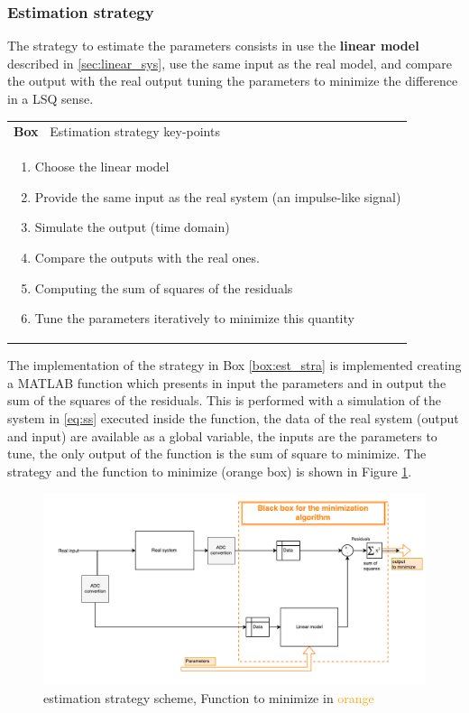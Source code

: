 \documentclass[twosided,a4paper]{article}           %
\newcounter{box}
\newenvironment{scatola}[1]
{\refstepcounter{box}
\begin{center}
		\begin{tabular}{|p{\linewidth}|}
			\hline \textbf{Box~\thebox} #1  \\
		}
		{ 
			 \\ \hline
		\end{tabular} 
	\end{center}
 }
\begin{document}
\subsubsection{Estimation strategy}
	\label{sec:est_strat}
 The strategy to estimate the parameters consists in use the \textbf{linear model} described in \ref{sec:linear_sys}, use the same input as the real model, and compare the output with the real output tuning the parameters to minimize the difference in a LSQ sense.
\begin{scatola}{Estimation strategy key-points}
	\label{box:est_stra}
 \begin{enumerate}
	 \item Choose the linear model
	 \item Provide the same input as the real system (an impulse-like signal)
	 \item Simulate the output (time domain)
	 \item Compare the outputs with the real ones.
	 \item Computing the sum of squares of the residuals
	 \item Tune the parameters iteratively to minimize this quantity
 \end{enumerate}
\end{scatola}
The implementation of the strategy in Box \ref{box:est_stra} is implemented creating a MATLAB function which presents in input the parameters and in output the sum of the squares of the residuals. This is performed with a simulation of the system in \eqref{eq:ss} executed inside the function, the data of the real system (output and input) are available as a global variable, the inputs are the parameters to tune, the only output of the function is the sum of square to minimize. The strategy and the function to minimize (orange box) is shown in Figure \ref{fig:eststrategy}.
\begin{figure}[H]
	\centering
	\includegraphics[width=\linewidth]{img/est_strategy}
	\caption{estimation strategy scheme, Function to minimize in \textcolor{orange}{orange}}
	\label{fig:eststrategy}
\end{figure}
\end{document}
